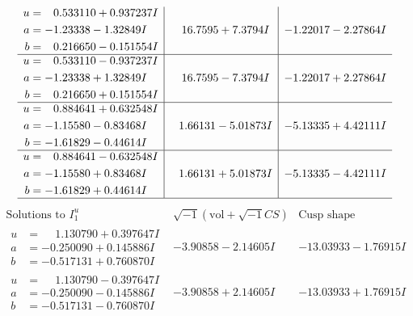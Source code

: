 \documentclass[1p]{elsarticle_modified}
\theoremstyle{definition}
\newcommand{\I}{\sqrt{-1}}
\begin{document}
$$\begin{array}{c|c|c}
\begin{aligned}
u &= \phantom{-}0.533110 + 0.937237 I \\
a &= -1.23338 - 1.32849 I \\
b &= \phantom{-}0.216650 - 0.151554 I\end{aligned}
 & \phantom{-}16.7595 + 7.3794 I & -1.22017 - 2.27864 I \\ \hline\begin{aligned}
u &= \phantom{-}0.533110 - 0.937237 I \\
a &= -1.23338 + 1.32849 I \\
b &= \phantom{-}0.216650 + 0.151554 I\end{aligned}
 & \phantom{-}16.7595 - 7.3794 I & -1.22017 + 2.27864 I \\ \hline\begin{aligned}
u &= \phantom{-}0.884641 + 0.632548 I \\
a &= -1.15580 - 0.83468 I \\
b &= -1.61829 - 0.44614 I\end{aligned}
 & \phantom{-}1.66131 - 5.01873 I & -5.13335 + 4.42111 I \\ \hline\begin{aligned}
u &= \phantom{-}0.884641 - 0.632548 I \\
a &= -1.15580 + 0.83468 I \\
b &= -1.61829 + 0.44614 I\end{aligned}
 & \phantom{-}1.66131 + 5.01873 I & -5.13335 - 4.42111 I\\
 \hline 
 \end{array}$$\newpage$$\begin{array}{c|c|c}  
\text{Solutions to }I^u_{1}& \I (\text{vol} + \sqrt{-1}CS) & \text{Cusp shape}\\
 \hline 
\begin{aligned}
u &= \phantom{-}1.130790 + 0.397647 I \\
a &= -0.250090 + 0.145886 I \\
b &= -0.517131 + 0.760870 I\end{aligned}
 & -3.90858 - 2.14605 I & -13.03933 - 1.76915 I \\ \hline\begin{aligned}
u &= \phantom{-}1.130790 - 0.397647 I \\
a &= -0.250090 - 0.145886 I \\
b &= -0.517131 - 0.760870 I\end{aligned}
 & -3.90858 + 2.14605 I & -13.03933 + 1.76915 I \\ \hline\begin{aligned}

\end{aligned}
\end{array}$$
\end{document}
